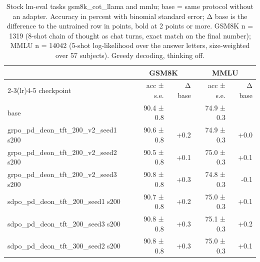 \begin{table}[t]
\centering
\caption{Stock lm-eval tasks gsm8k_cot_llama and mmlu; base = same protocol without an adapter. Accuracy in percent with binomial standard error; Δ base is the difference to the untrained row in points, bold at 2 points or more. GSM8K n = 1319 (8-shot chain of thought as chat turns, exact match on the final number); MMLU n = 14042 (5-shot log-likelihood over the answer letters, size-weighted over 57 subjects). Greedy decoding, thinking off.}
\label{tab:T1-retention}
\small
\setlength{\tabcolsep}{3.5pt}
\begin{tabular}{lrrrr}
\toprule
 & \multicolumn{2}{c}{GSM8K} & \multicolumn{2}{c}{MMLU} \\
\cmidrule(lr){2-3}\cmidrule(lr){4-5}
checkpoint & acc ± s.e. & Δ base & acc ± s.e. & Δ base \\
\midrule
base & 90.4 ± 0.8 &  & 74.9 ± 0.3 &  \\
grpo_pd_deon_tft_200_v2_seed1 s200 & 90.6 ± 0.8 & +0.2 & 74.9 ± 0.3 & +0.0 \\
grpo_pd_deon_tft_200_v2_seed2 s200 & 90.5 ± 0.8 & +0.1 & 75.0 ± 0.3 & +0.1 \\
grpo_pd_deon_tft_200_v2_seed3 s200 & 90.8 ± 0.8 & +0.3 & 74.8 ± 0.3 & -0.1 \\
sdpo_pd_deon_tft_200_seed1 s200 & 90.7 ± 0.8 & +0.2 & 75.0 ± 0.3 & +0.1 \\
sdpo_pd_deon_tft_200_seed3 s200 & 90.8 ± 0.8 & +0.3 & 75.1 ± 0.3 & +0.2 \\
sdpo_pd_deon_tft_300_seed2 s200 & 90.8 ± 0.8 & +0.3 & 75.0 ± 0.3 & +0.1 \\
\bottomrule
\end{tabular}
\end{table}

